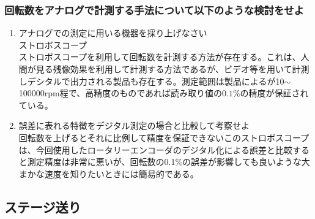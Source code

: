 \documentclass[a4j,twoside,openright,11pt]{jarticle}
\begin{document}
\subsubsection{回転数をアナログで計測する手法について以下のような検討をせよ}
\begin{enumerate}
\item アナログでの測定に用いる機器を採り上げなさい\\
ストロボスコープ\\
ストロボスコープを利用して回転数を計測する方法が存在する。これは、人間が見る残像効果を利用して計測する方法であるが、ビデオ等を用いて計測しデシタルで出力される製品も存在する。測定範囲は製品によるが10$\sim$100000rpm程で、高精度のものであれば読み取り値の$0.1\%$の精度が保証されている。\\
\item 誤差に表れる特徴をデジタル測定の場合と比較して考察せよ\\
回転数を上げるとそれに比例して精度を保証できないこのストロボスコープは、今回使用したロータリーエンコーダのデジタル化による誤差と比較すると測定精度は非常に悪いが、回転数の0.1\%の誤差が影響しても良いような大まかな速度を知りたいときには簡易的である。
\end{enumerate}
\subsection{ステージ送り}
\end{document}
